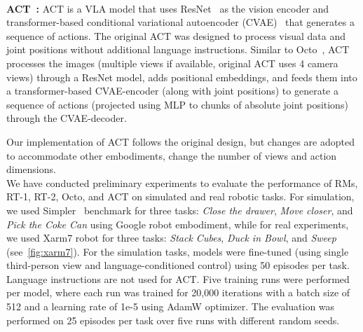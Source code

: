\documentclass[11pt,letterpaper]{article}
\begin{document}
\\
\noindent\textbf{ ACT~\cite{zhao2023learningFB}:} ACT is a VLA model that uses ResNet~\cite{resnet} as the vision encoder and transformer-based
conditional variational autoencoder (CVAE)~\cite{sohn2015learning} that generates a sequence of actions. The original ACT 
was designed to process visual data and joint positions without additional language instructions. 
Similar to Octo~\cite{team2024octo}, ACT processes the images (multiple views if available, \eg original ACT uses 4 camera views) through a ResNet model, adds positional embeddings, and feeds them into a transformer-based CVAE-encoder (along with joint positions) to generate a sequence of actions (projected using MLP to chunks of absolute joint positions) through the CVAE-decoder.

Our implementation of ACT follows the original design, but changes are adopted to accommodate other embodiments, \eg change the number of views and action dimensions.%
\\
We have conducted preliminary experiments to evaluate the performance 
of RMs, \ie RT-1, RT-2, Octo, and ACT on simulated and real robotic tasks. 
For simulation, we used Simpler~\cite{li24simpler} benchmark for three tasks: \emph{Close the drawer}, \emph{Move closer}, and \emph{Pick the Coke Can} using Google robot embodiment, while for real experiments, we used Xarm7 robot for three tasks: \emph{Stack Cubes}, \emph{Duck in Bowl}, and \emph{Sweep} (see~\autoref{fig:xarm7}).
For the simulation tasks, models were fine-tuned (using 
single third-person view and language-conditioned control) using 50 episodes per task. Language instructions are not used for ACT. Five training runs were performed per model, where each run was trained for 20,000 iterations with a batch size of 512 and a learning rate of 1e-5 using AdamW optimizer. The evaluation was performed on 25 episodes per task over five runs with different random seeds.
\end{document}
